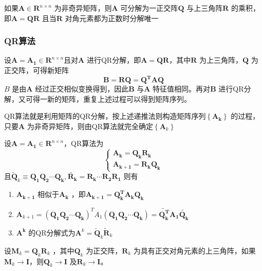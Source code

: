 \documentclass[a4paper]{article}
\begin{document}
\begin{theorem}
	如果$\mathbf{A} \in \mathbf{R}^{n \times n}$ 为非奇异矩阵，则$\mathbf{A}$ 可分解为一正交阵$\mathbf{Q}$ 与上三角阵$\mathbf{R}$ 的乘积，即$\mathbf{A = QR}$ 且当$\mathbf{R}$ 对角元素都为正数时分解唯一
\end{theorem}

\subsubsection{QR算法}
设$\mathbf{A} = \mathbf{A_1} \in \mathbf{R}^{n \times n}$且对$\mathbf{A}$ 进行QR分解，即$\mathbf{A} = \mathbf{QR}$，其中$\mathbf{R}$ 为上三角阵，$\mathbf{Q}$ 为正交阵，可得新矩阵
\[
\mathbf{B} = \mathbf{RQ} = \mathbf{Q^{T}AQ}
\] 
$B$ 是由$\mathbf{A}$ 经过正交相似变换得到，因此$\mathbf{B}$ 与$\mathbf{A}$ 特征值相同。再对$\mathbf{B}$ 进行QR分解，又可得一新的矩阵，重复上述过程可以得到矩阵序列。

QR算法就是利用矩阵的QR分解，按上述递推法则构造矩阵序列$\left\{ \mathbf{A_k} \right\} $ 的过程，只要$\mathbf{A}$ 为非奇异矩阵，则由QR算法就完全确定$\left\{ \mathbf{A}_k \right\} $

\begin{theorem}
	设$\mathbf{A} = \mathbf{A_1} \in \mathbf{R}^{n \times n}$，QR算法为
	\[
		\tag{8.4.8} \label{eq:8.4.8} 
	\begin{cases}
	\mathbf{A_k} = \mathbf{Q_k R_k} \\
	\mathbf{A_{k+1}} = \mathbf{R_k Q_k}
	\end{cases} 
	\] 
	且$\tilde{\mathbf{Q}}_k \equiv \mathbf{Q_1 Q_2 \cdots Q_k}, \tilde{\mathbf{R_k}} = \mathbf{R_k \cdots R_2 R_1}$
	则有
	\begin{enumerate}
		\item $\mathbf{A_{k+1}}$ 相似于$\mathbf{A_k}$ ，即$\mathbf{A_{k+1}} = \mathbf{Q_k^{T} A_k Q_k}$
		\item $\mathbf{A}_{k+1} = (\mathbf{Q_1 Q_2 \cdots Q_k})^{T} A_1 (\mathbf{Q_1 Q_2 \cdots Q_k}) = \tilde{\mathbf{Q_k^{T}}} \mathbf{A_1} \tilde{\mathbf{Q_k}}$
		\item $\mathbf{A^{k}}$ 的QR分解式为$\mathbf{A}^{k} = \tilde{\mathbf{Q}}_k \tilde{\mathbf{R}}_k$
	\end{enumerate}
\end{theorem}

设$\mathbf{M}_k = \mathbf{Q}_k \mathbf{R}_k$ ，其中$\mathbf{Q}_k$ 为正交阵，$\mathbf{R}_k$ 为具有正交对角元素的上三角阵，如果$\mathbf{M}_k \to \mathbf{I}$，则$\mathbf{Q}_k \to \mathbf{I}$ 及$\mathbf{R}_k \to \mathbf{I}$。
\end{document}
